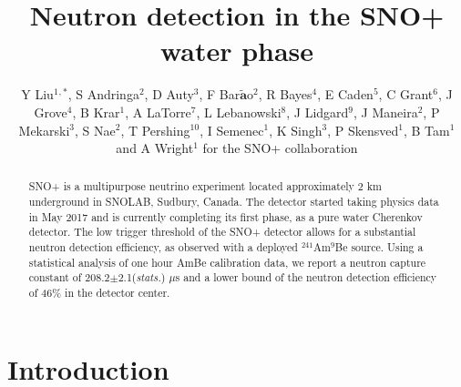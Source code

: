\documentclass[a4paper]{jpconf}
\begin{document}
\title{Neutron detection in the SNO+ water phase}

\author{Y Liu$^1$$^{,\ast}$, S Andringa$^2$, D Auty$^3$, F Bar$\tilde{\textbf{a}}$o$^2$, R Bayes$^4$, E Caden$^5$, C Grant$^6$, J Grove$^4$, B Krar$^1$, A LaTorre$^7$, L Lebanowski$^8$, J Lidgard$^9$, J Maneira$^2$, P Mekarski$^3$, S Nae$^2$, T Pershing$^{10}$, I Semenec$^1$, K Singh$^3$, P Skensved$^1$, B Tam$^1$ and A Wright$^1$ for the SNO+ collaboration}

\address{$^1$ Queen's University, Department of Physics, Engineering Physics \& Astronomy, Kingston ON K7L 3N6, Canada}
\address{$^2$ Laborat\'{o}rio de Instrumenta{\c c}$\tilde{a}$o e F{\'{i}}sica Experimental de Part{\'{i}}culas, Av. Prof. Gama Pinto, 2, 1649-003, Lisbon, Portugal}
\address{$^3$ University of Alberta, Department of Physics, 4-181 CCIS, Edmonton, AB T6G 2E, Canada}
\address{$^4$ Laurentian University, 935 Ramsey Lake Road, Sudbury, ON P3E 2C6, Canada}
\address{$^5$ SNOLAB, Creighton Mine \#9, 1039 Regional Road 24, Sudbury, ON P3Y 1N2, Canada}
\address{$^6$ Boston University, Department of Physics, Boston, MA 02215, USA}
\address{$^7$ University of Chicago, Department of Physics, Chicago, IL 60637, USA}
\address{$^8$ University of Pennsylvania, Department of Physics \& Astronomy, Philadelphia, PA 19104-6396, USA}
\address{$^9$ University of Oxford, The Denys Wilkinson Building, Keble Road, Oxford, OX1 3RH, UK}
\address{$^{10}$ University of California, 1 Shields Avenue, Davis, CA 95616, USA}


\begin{abstract}
SNO+ is a multipurpose neutrino experiment located approximately 2 km underground in SNOLAB, Sudbury, Canada. The detector started taking physics data in May 2017 and is currently completing its first phase, as a pure water Cherenkov detector. The low trigger threshold of the SNO+ detector allows for a substantial neutron detection efficiency, as observed with a deployed $^{241}$Am$^{9}$Be source. Using a statistical analysis of one hour AmBe calibration data, we report a neutron capture constant of 208.2$\pm$2.1(\textit{stats.}) $\mu$s and a lower bound of the neutron detection efficiency of 46\% in the detector center.
\end{abstract}

\section{Introduction}
\end{document}
